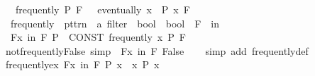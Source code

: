 \begin{isabellebody}
\ \ \ {\isachardoublequoteopen}frequently\ P\ F\ {\isasymlongleftrightarrow}\ {\isasymnot}\ eventually\ {\isacharparenleft}{\kern0pt}{\isasymlambda}x{\isachardot}{\kern0pt}\ {\isasymnot}\ P\ x{\isacharparenright}{\kern0pt}\ F{\isachardoublequoteclose}\isanewline
\isanewline
{}\isamarkupfalse%
\isanewline
\ \ {\isachardoublequoteopen}{\isacharunderscore}{\kern0pt}frequently{\isachardoublequoteclose}\ {\isacharcolon}{\kern0pt}{\isacharcolon}{\kern0pt}\ {\isachardoublequoteopen}pttrn\ {\isasymRightarrow}\ {\isacharprime}{\kern0pt}a\ filter\ {\isasymRightarrow}\ bool\ {\isasymRightarrow}\ bool{\isachardoublequoteclose}\ \ {\isacharparenleft}{\kern0pt}{\isachardoublequoteopen}{\isacharparenleft}{\kern0pt}{}{\isasymexists}\isactrlsub F\ {\isacharunderscore}{\kern0pt}\ in\ {\isacharunderscore}{\kern0pt}{\isachardot}{\kern0pt}{\isacharslash}{\kern0pt}\ {\isacharunderscore}{\kern0pt}{\isacharparenright}{\kern0pt}{\isachardoublequoteclose}\ {\isacharbrackleft}{\kern0pt}{}{\isacharcomma}{\kern0pt}\ {}{\isacharcomma}{\kern0pt}\ {}{}{\isacharbrackright}{\kern0pt}\ {}{}{\isacharparenright}{\kern0pt}\isanewline
{}\isamarkupfalse%
\isanewline
\ \ {\isachardoublequoteopen}{\isasymexists}\isactrlsub Fx\ in\ F{\isachardot}{\kern0pt}\ P{\isachardoublequoteclose}\ {\isacharequal}{\kern0pt}{\isacharequal}{\kern0pt}\ {\isachardoublequoteopen}CONST\ frequently\ {\isacharparenleft}{\kern0pt}{\isasymlambda}x{\isachardot}{\kern0pt}\ P{\isacharparenright}{\kern0pt}\ F{\isachardoublequoteclose}\isanewline
\isanewline
{}\isamarkupfalse%
\ not{\isacharunderscore}{\kern0pt}frequently{\isacharunderscore}{\kern0pt}False\ {\isacharbrackleft}{\kern0pt}simp{\isacharbrackright}{\kern0pt}{\isacharcolon}{\kern0pt}\ {\isachardoublequoteopen}{\isasymnot}\ {\isacharparenleft}{\kern0pt}{\isasymexists}\isactrlsub Fx\ in\ F{\isachardot}{\kern0pt}\ False{\isacharparenright}{\kern0pt}{\isachardoublequoteclose}\isanewline
%
\isadelimproof
\ \ %
\endisadelimproof
%
\isatagproof
{}\isamarkupfalse%
\ {\isacharparenleft}{\kern0pt}simp\ add{\isacharcolon}{\kern0pt}\ frequently{\isacharunderscore}{\kern0pt}def{\isacharparenright}{\kern0pt}%
\endisatagproof
{\isafoldproof}%
%
\isadelimproof
\isanewline
%
\endisadelimproof
\isanewline
{}\isamarkupfalse%
\ frequently{\isacharunderscore}{\kern0pt}ex{\isacharcolon}{\kern0pt}\ {\isachardoublequoteopen}{\isasymexists}\isactrlsub Fx\ in\ F{\isachardot}{\kern0pt}\ P\ x\ {\isasymLongrightarrow}\ {\isasymexists}x{\isachardot}{\kern0pt}\ P\ x{\isachardoublequoteclose}\isanewline

\end{isabellebody}
